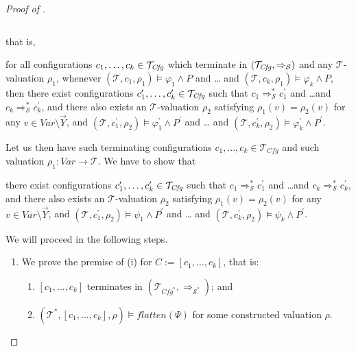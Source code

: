 \begin{proof}[Proof of ]
\begin{enumerate}
\begin{proofenv}
\begin{equation*}
        \end{equation*}
    \end{proofenv}
    that is,
    \begin{proofenv}
        for all configurations $c_1,\ldots,c_k \in \mathcal{T}_{\mathit{Cfg}}$
        which terminate in $(\mathcal{T}_{\mathit{Cfg}}, \Rightarrow_{\mathcal{S}})$
        and any $\mathcal{T}$-valuation $\rho_1$,
        whenever $(\mathcal{T}, c_1,\rho_1) \vDash \varphi_1 \land P$ and \ldots
        and $(\mathcal{T}, c_k,\rho_1) \vDash \varphi_k \land P$,
        then there exist configurations $c_1^\prime,\ldots,c_k^\prime \in \mathcal{T}_{\mathit{Cfg}}$
        such that $c_1 \Rightarrow^{*}_{\mathcal{S}} c_1^\prime$
        and \ldots and $c_k \Rightarrow^{*}_{\mathcal{S}} c_k^\prime$,
        and there also exists an $\mathcal{T}$-valuation $\rho_2$
        satisfying $\rho_1(v) = \rho_2(v)$ for any $v \in \mathit{Var} \setminus \vec{Y}$,
        and
        $(\mathcal{T}, c_1^\prime,\rho_2) \vDash \varphi^\prime_1 \land P^\prime$ and \ldots
        and $(\mathcal{T}, c_k^\prime, \rho_2) \vDash \varphi^\prime_k \land P^\prime$.
    \end{proofenv}
    Let us then have such terminating configurations $c_1,\ldots,c_k \in \mathcal{T}_{\mathit{Cfg}}$
    and such valuation $\rho_1 : \mathit{Var} \to \mathcal{T}$.
    We have to show that
    \begin{proofenv}
        there exist configurations $c_1^\prime,\ldots,c_k^\prime \in \mathcal{T}_{\mathit{Cfg}}$
        such that $c_1 \Rightarrow^{*}_{\mathcal{S}} c_1^\prime$
        and \ldots and $c_k \Rightarrow^{*}_{\mathcal{S}} c_k^\prime$,
        and there also exists an $\mathcal{T}$-valuation $\rho_2$
        satisfying $\rho_1(v) = \rho_2(v)$ for any $v \in \mathit{Var} \setminus \vec{Y}$,
        and
        $(\mathcal{T}, c_1^\prime,\rho_2) \vDash \psi_1 \land P^\prime$ and \ldots
        and $(\mathcal{T}, c_k^\prime, \rho_2) \vDash \psi_k \land P^\prime$.
    \end{proofenv}
    We will proceed in the following steps.
    \begin{enumerate}
        \item We prove the premise of (i) for $C := [c_1,\ldots,c_k]$, that is:
        \begin{enumerate}
            \item $[c_1,\ldots,c_k]$ terminates in $(\mathcal{T}_{\mathit{Cfg}^*}, \Rightarrow_{\mathcal{S}^*})$; and
            \item $(\mathcal{T}^*, [c_1,\ldots,c_k], \rho) \vDash \mathit{flatten}(\Psi)$ for some constructed valuation $\rho$.

\end{enumerate}
\end{enumerate}
\end{enumerate}
\end{proof}
